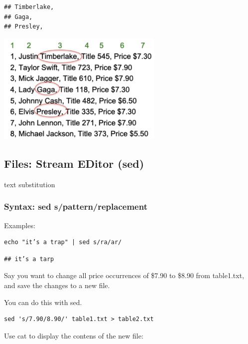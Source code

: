 \documentclass[
]{book}
\begin{document}
\begin{verbatim}
## Timberlake,
## Gaga,
## Presley,
\end{verbatim}

\includegraphics[width=0.6\textwidth,height=\textheight]{./Figures/awk.png}

\hypertarget{files-stream-editor-sed}{%
\subsection{\texorpdfstring{Files: \textbf{S}tream \textbf{ED}itor (sed)}{Files: Stream EDitor (sed)}}\label{files-stream-editor-sed}}

text substitution

\hypertarget{syntax-sed-spatternreplacement}{%
\subsubsection*{Syntax: sed s/pattern/replacement}\label{syntax-sed-spatternreplacement}}

Examples:

\begin{verbatim}
echo "it’s a trap" | sed s/ra/ar/
\end{verbatim}

\begin{verbatim}
## it’s a tarp
\end{verbatim}

Say you want to change all price occurrences of \$7.90 to \$8.90 from table1.txt, and save the changes to a new file.

You can do this with sed.

\begin{verbatim}
sed 's/7.90/8.90/' table1.txt > table2.txt
\end{verbatim}

Use cat to display the contens of the new file:
\end{document}

